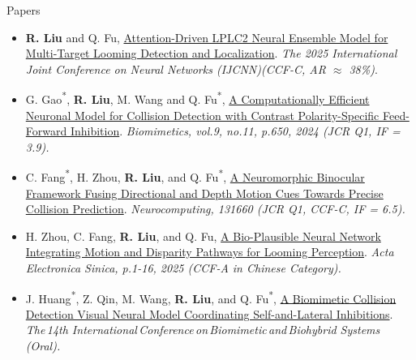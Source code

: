 \documentclass{resume} %
\begin{document}



\begin{rSection}{Papers}
\begin{itemize}[left = -0.22in]
	
	\item \textbf{R. Liu} and Q. Fu, 
	\href{https://ieeexplore.ieee.org/document/11227781}
	{Attention-Driven LPLC2 Neural Ensemble Model for Multi-Target Looming Detection and Localization}. 
	\textit{The 2025 International Joint Conference on Neural Networks (IJCNN)(CCF-C, AR $\approx$ 38\%)}.
	
	
	\item G. Gao\textsuperscript{*}, \textbf{R. Liu}, M. Wang and Q. Fu\textsuperscript{*}, \href{https://www.mdpi.com/2313-7673/9/11/650}
	{A Computationally Efficient Neuronal Model for Collision Detection with Contrast Polarity-Specific Feed-Forward Inhibition}. 
	\textit{Biomimetics, vol.9, no.11, p.650, 2024 (JCR Q1, IF = 3.9).}	
	
	
	\item C. Fang\textsuperscript{*}, H. Zhou, \textbf{R. Liu}, and Q. Fu\textsuperscript{*},
	\href{https://www.sciencedirect.com/science/article/pii/S092523122502332X}
	{A Neuromorphic Binocular Framework Fusing Directional and Depth Motion Cues Towards Precise Collision Prediction}. 
	\textit{Neurocomputing, 131660 (JCR Q1, CCF-C, IF = 6.5).}
	
		
	\item H. Zhou, C. Fang, \textbf{R. Liu}, and Q. Fu,
	\href{https://www.ejournal.org.cn/thesisDetails#10.12263/DZXB.20250337&lang=en}
	{A Bio-Plausible Neural Network Integrating Motion and Disparity Pathways for Looming Perception}. 
	\textit{Acta Electronica Sinica, p.1-16, 2025 (CCF-A in Chinese Category).}
	
	
	\item J. Huang\textsuperscript{*}, Z. Qin, M. Wang, \textbf{R. Liu}, and Q. Fu\textsuperscript{*}, 
	\href{https://ryannnice.github.io/assets/A biomimetic collision detection visual neural model coordinating self-and-lateral inhibitions.pdf}
	{A Biomimetic Collision Detection Visual Neural Model Coordinating Self-and-Lateral Inhibitions}.$\,$
	\textit{The$\,$14th International$\,$Conference$\,$on$\,$Biomimetic$\,$and$\,$Biohybrid Systems (Oral).} %



\end{itemize}
\end{rSection}
\end{document}
